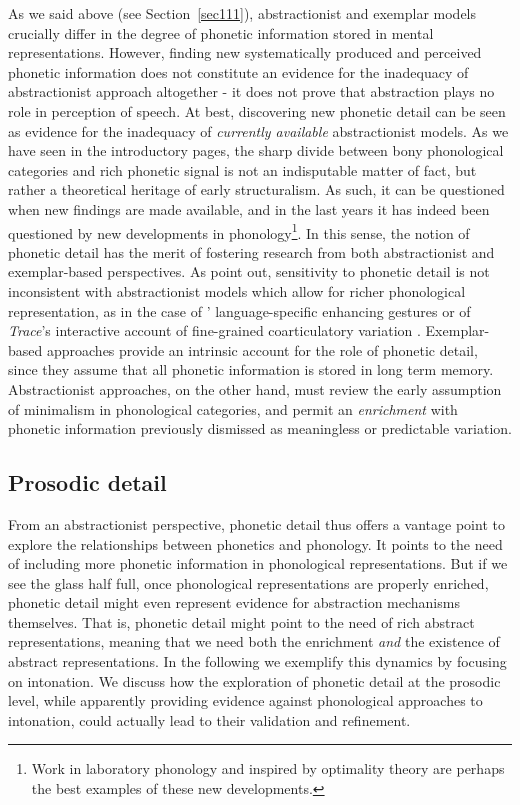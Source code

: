 As we said above (see Section~\ref{sec111}), abstractionist and exemplar models crucially differ in the degree of phonetic information stored in mental representations. However, finding new systematically produced and perceived phonetic information does not constitute an evidence for the inadequacy of abstractionist approach altogether - it does not prove that abstraction plays no role in perception of speech. At best, discovering new phonetic detail can be seen as evidence for the inadequacy of \textit{currently available} abstractionist models. As we have seen in the introductory pages, the sharp divide between bony phonological categories and rich phonetic signal is not an indisputable matter of fact, but rather a theoretical heritage of early structuralism. As such, it can be questioned when new findings are made available, and in the last years it has indeed been questioned by new developments in phonology\footnote{Work in laboratory phonology \citep{ohala1990interface,pierrehumbert1990phonological,pierrehumbert2000conceptual} and inspired by optimality theory \citep{flemming1997phonetic,flemming2001scalar} are perhaps the best examples of these new developments.}. In this sense, the notion of phonetic detail has the merit of fostering research from both abstractionist and exemplar-based perspectives. As \citet{nguyen2009dynamical} point out, sensitivity to phonetic detail is not inconsistent with abstractionist models which allow for richer phonological representation, as in the case of \citeauthor{stevens2004invariance}' \citeyear{stevens2004invariance} language-specific enhancing gestures or of \textit{Trace}'s interactive account of fine-grained coarticulatory variation \citep{elman1988cognitive}. Exemplar-based approaches provide an intrinsic account for the role of phonetic detail, since they assume that all phonetic information is stored in long term memory. Abstractionist approaches, on the other hand, must review the early assumption of minimalism in phonological categories, and permit an \textit{enrichment} with phonetic information previously dismissed as meaningless or predictable variation.

\subsection{Prosodic detail}\label{sec113}
From an abstractionist perspective, phonetic detail thus offers a vantage point to explore the relationships between phonetics and phonology. It points to the need of including more phonetic information in phonological representations. But if we see the glass half full, once phonological representations are properly enriched, phonetic detail might even represent evidence for abstraction mechanisms themselves. That is, phonetic detail might point to the need of rich abstract representations, meaning that we need both the enrichment \textit{and} the existence of abstract representations. In the following we exemplify this dynamics by focusing on intonation. We discuss how the exploration of phonetic detail at the prosodic level, while apparently providing evidence against phonological approaches to intonation, could actually lead to their validation and refinement.

